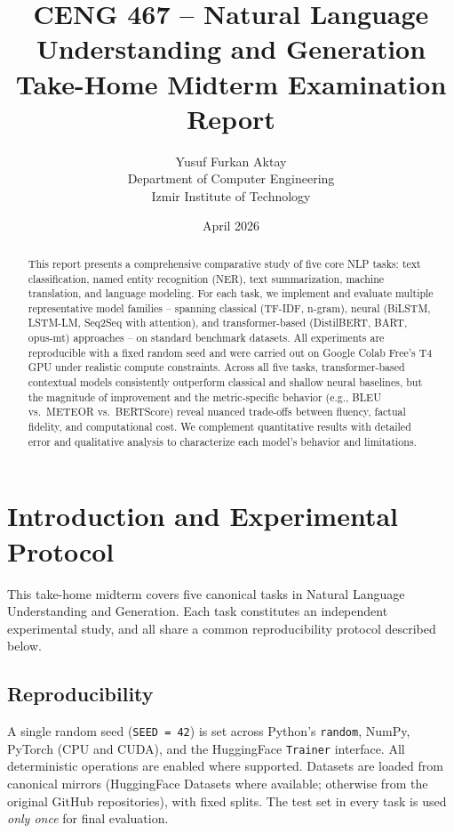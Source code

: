\documentclass[11pt,a4paper]{article}
\title{\vspace{-1.5em}\textbf{CENG 467 -- Natural Language Understanding and Generation}\\[0.3em]
\large Take-Home Midterm Examination Report}
\author{Yusuf Furkan Aktay\\
\small Department of Computer Engineering\\
\small Izmir Institute of Technology}
\date{April 2026}
\begin{document}
\maketitle
\thispagestyle{fancy}

\begin{abstract}
\noindent
This report presents a comprehensive comparative study of five core NLP tasks: text classification, named entity recognition (NER), text summarization, machine translation, and language modeling. For each task, we implement and evaluate multiple representative model families -- spanning classical (TF-IDF, n-gram), neural (BiLSTM, LSTM-LM, Seq2Seq with attention), and transformer-based (DistilBERT, BART, opus-mt) approaches -- on standard benchmark datasets. All experiments are reproducible with a fixed random seed and were carried out on Google Colab Free's T4 GPU under realistic compute constraints. Across all five tasks, transformer-based contextual models consistently outperform classical and shallow neural baselines, but the magnitude of improvement and the metric-specific behavior (e.g., BLEU vs.\ METEOR vs.\ BERTScore) reveal nuanced trade-offs between fluency, factual fidelity, and computational cost. We complement quantitative results with detailed error and qualitative analysis to characterize each model's behavior and limitations.
\end{abstract}

\vspace{-0.6em}

\section{Introduction and Experimental Protocol}

This take-home midterm covers five canonical tasks in Natural Language Understanding and Generation. Each task constitutes an independent experimental study, and all share a common reproducibility protocol described below.

\subsection{Reproducibility}

A single random seed (\texttt{SEED = 42}) is set across Python's \texttt{random}, NumPy, PyTorch (CPU and CUDA), and the HuggingFace \texttt{Trainer} interface. All deterministic operations are enabled where supported. Datasets are loaded from canonical mirrors (HuggingFace Datasets where available; otherwise from the original GitHub repositories), with fixed splits. The test set in every task is used \emph{only once} for final evaluation.
\end{document}

